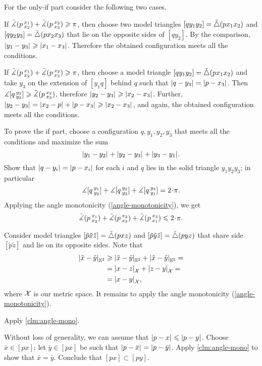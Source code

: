  For the only-if part consider the following two cases.

If $\tilde\measuredangle(p\,{}^{x_1}_{x_2})+\tilde\measuredangle(p\,{}^{x_2}_{x_3})\geqslant \pi$, then choose two model triangles $[qy_1y_2]=\tilde\triangle(px_1x_2)$ and $[qy_2y_3]=\tilde\triangle(px_2x_3)$ that lie on the opposite sides of $[qy_2]$.
By the comparison, $|{y_1}-{y_3}|_{}^{{}}\geqslant |{x_1}-{x_3}|_{}^{{}}$.
Therefore the obtained configuration meets all the conditions.

If $\tilde\measuredangle(p\,{}^{x_1}_{x_2})+\tilde\measuredangle(p\,{}^{x_2}_{x_3})\geqslant \pi$, then choose a model triangle $[qy_1y_2]=\tilde\triangle(px_1x_2)$
and take $y_3$ on the extension of $[y_1q]$ behind $q$ such that $|{q}-{y_3}|_{}^{{}}=|{p}-{x_3}|_{}^{{}}$.
Then $\measuredangle [q\,{}^{y_2}_{y_3}]\geqslant \tilde\measuredangle(p\,{}^{x_2}_{x_3})$, therefore $|{y_2}-{y_3}|_{}^{{}}\geqslant |{x_2}-{x_3}|_{}^{{}}$.
Further, $|{y_2}-{y_3}|_{}^{{}}=|{x_2}-{p}|_{}^{{}}+|{p}-{x_3}|_{}^{{}} \geqslant |{x_2}-{x_3}|_{}^{{}}$,
and again, the obtained configuration meets all the conditions.

To prove the if part, choose a configuration $q,y_1,y_2,y_3$ that meets all the conditions and maximize the sum
\[|{y_1}-{y_2}|_{}^{{}}+|{y_2}-{y_3}|_{}^{{}}+|{y_3}-{y_1}|_{}^{{}}.\]
Show that $|{q}-{y_i}|_{}^{{}}=|{p}-{x_i}|_{}^{{}}$ for each $i$ and $q$ lies in the solid triangle $y_1y_2y_3$;
in particular 
\[\mangle \hinge q{y_1}{y_2}+\mangle \hinge q{y_2}{y_3}+ \mangle \hinge q{y_3}{y_1}=2\cdot\pi.\]
Applying the angle monotonicity (\ref{angle-monotonicity}), we get
\[\angk  p{x_1}{x_2}+\angk p{x_2}{x_3}+\angk p{x_3}{x_1}
\le 
2\cdot\pi.
\]

Consider model triangles $[\tilde p\tilde x\tilde z]=\tilde\triangle(pxz)$ and $[\tilde p\tilde y\tilde z]=\tilde\triangle(pyz)$
that share side $[\tilde p\tilde z]$ and lie on its opposite sides.
Note that 
\begin{align*}
|{\tilde x}-{\tilde y}|_{\mathbb{E}^2}^{{}}
&\geqslant |{\tilde x}-{\tilde y}|_{\mathbb{E}^2}^{{}}+|{\tilde x}-{\tilde y}|_{\mathbb{E}^2}^{{}}=
\\
&=|{x}-{z}|_{\mathcal{X}}^{{}}+|{z}-{y}|_{\mathcal{X}}^{{}}=
\\
&=|{x}-{y}|_{\mathcal{X}}^{{}},
\end{align*}
where $\mathcal{X}$ is our metric space.
It remains to apply the angle monotonicity (\ref{angle-monotonicity}).


Apply \ref{clm:angle-mono}.

Without loss of generality, we can assume that $|{p}-{x}|_{}^{{}}\leqslant |{p}-{y}|_{}^{{}}$.
Choose $\bar x\in [px]$;
let $\bar y\in [px]$ be such that $|{p}-{\bar x}|_{}^{{}}=|{p}-{\bar y}|_{}^{{}}$.
Apply \ref{clm:angle-mono} to show that $\bar x=\bar y$.
Conclude that $[px]\subset [py]$.

